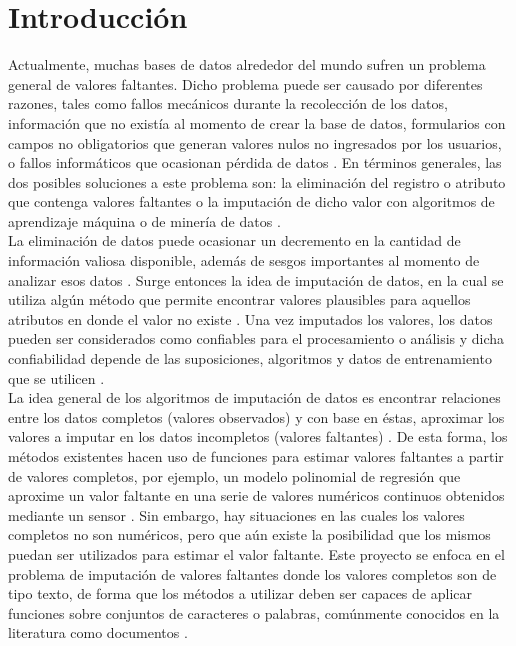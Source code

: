 \chapter{Introducción}
Actualmente, muchas bases de datos alrededor del mundo sufren un problema general de valores faltantes. Dicho problema puede ser causado por diferentes razones, tales como fallos mecánicos durante la recolección de los datos, información que no existía al momento de crear la base de datos, formularios con campos no obligatorios que generan valores nulos no ingresados por los usuarios, o fallos informáticos que ocasionan pérdida de datos \cite{anagnostopoulos2014scaling,tran2015multiple}. En términos generales, las dos posibles soluciones a este problema son: la eliminación del registro o atributo que contenga valores faltantes o la imputación de dicho valor con algoritmos de aprendizaje máquina o de minería de datos \cite{anagnostopoulos2014scaling}.\\
La eliminación de datos puede ocasionar un decremento en la cantidad de información valiosa disponible, además de sesgos importantes al momento de analizar esos datos \cite{truong2004learning}. Surge entonces la idea de imputación de datos, en la cual se utiliza algún método que permite encontrar valores plausibles para aquellos atributos en donde el valor no existe \cite{truong2004learning}. Una vez imputados los valores, los datos pueden ser considerados como confiables para el procesamiento o análisis y dicha confiabilidad depende de las suposiciones, algoritmos y datos de entrenamiento que se utilicen \cite{anagnostopoulos2014scaling, truong2004learning}.\\
La idea general de los algoritmos de imputación de datos es encontrar relaciones entre los datos completos (valores observados) y con base en éstas, aproximar los valores a imputar en los datos incompletos (valores faltantes) \cite{mavai2014survey}. De esta forma, los métodos existentes hacen uso de funciones para estimar valores faltantes a partir de valores completos, por ejemplo, un modelo polinomial de regresión que aproxime un valor faltante en una serie de valores numéricos continuos obtenidos mediante un sensor \cite{tran2015multiple}. Sin embargo, hay situaciones en las cuales los valores completos no son numéricos, pero que aún existe la posibilidad que los mismos puedan ser utilizados para estimar el valor faltante. Este proyecto se enfoca en el problema de imputación de valores faltantes donde los valores completos son de tipo texto, de forma que los métodos a utilizar deben ser capaces de aplicar funciones sobre conjuntos de caracteres o palabras, comúnmente conocidos en la literatura como documentos \cite{srivastava2009text}.\\
